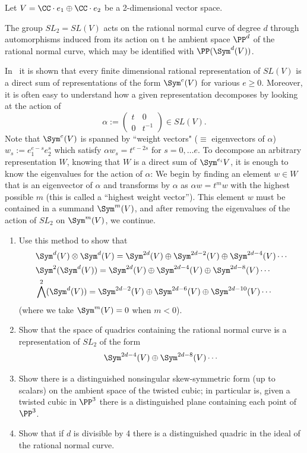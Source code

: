 \begin{exercise}\label{rnc and representations}
Let $V = \CC\cdot e_1\oplus \CC\cdot e_2$ be a 2-dimensional vector space. 

The group $SL_2= SL(V)$ acts on the rational normal curve of degree $d$ through automorphisms induced from its action on
t he ambient space $\PP^d$ of the rational normal curve, which may be identified with $\PP(\Sym^d(V))$.

In~\cite[pp. 146--150]{Fulton-Harris} it is shown that
 every finite dimensional rational 
representation of $SL(V)$ is a direct sum of representations of the form $\Sym^e(V)$ for various $e\geq 0$. Moreover, it is often easy to understand
how a given representation decomposes by looking at the action of
$$
\alpha := \begin{pmatrix}
t&0\\
0&t^{-1}
\end{pmatrix}
\in SL(V).
$$
Note that $\Sym^e(V)$ is spanned by ``weight vectors" ($\equiv$ eigenvectors of $\alpha$) $w_s := e_1^{e-s} e_2^{s}$ 
which satisfy $\alpha w_s = t^{e-2s}$ for $s = 0, \dots e$.
To decompose an arbitrary representation $W$, knowing that $W$ is a direct sum of $\Sym^{e_i}V$, it is enough to know the 
eigenvalues for the action of $\alpha$: We begin by finding an element $w\in W$ that
is an eigenvector of $\alpha$ and transforms by $\alpha$ as $\alpha w = t^mw$ with the highest possible $m$ (this is called a ``highest weight vector''). This element $w$ must be contained
in a summand $\Sym^m(V)$, and after removing the eigenvalues of the action of $SL_2$ on $\Sym^m(V)$, we continue. 
\begin{enumerate}
 \item Use this method to show that 
\begin{align*}
&\Sym^d(V)\otimes \Sym^d(V)= \Sym^{2d}(V) \oplus  \Sym^{2d-2}(V) \oplus \Sym^{2d-4}(V) \cdots\\
 &\Sym^2(\Sym^d(V))= \Sym^{2d}(V) \oplus \Sym^{2d-4}(V)\oplus \Sym^{2d-8}(V) \cdots\\
 &\bigwedge^2(\Sym^d(V))= \Sym^{2d-2}(V) \oplus \Sym^{2d-6}(V)\oplus \Sym^{2d-10}(V) \cdots
\end{align*}
  (where we take $\Sym^{m}(V)=0$ when $m<0$).
 \item Show that the space of quadrics containing the rational normal curve is a representation of $SL_2$ of the form
 $$
 \Sym^{2d-4}(V)\oplus \Sym^{2d-8}(V) \cdots
 $$
  \item Show  there is a distinguished nonsingular skew-symmetric form (up to scalars) on the ambient space of the twisted cubic; in particular
  is, given a twisted cubic in $\PP^3$ there is a distinguished plane containing each point of $\PP^3$.
 \item Show that if $d$ is divisible by 4 there is a distinguished quadric in the ideal of the rational normal curve.
\end{enumerate}
\end{exercise}

